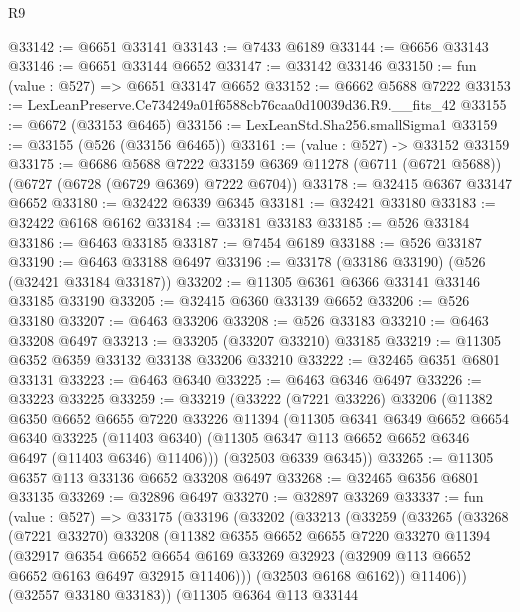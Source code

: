 \begin{lexlean}{R9}
\begin{coremodule}
@33142 := @6651 @33141
@33143 := @7433 @6189
@33144 := @6656 @33143
@33146 := @6651 @33144 @6652
@33147 := @33142 @33146
@33150 := fun (value : @527) => @6651 @33147 @6652
@33152 := @6662 @5688 @7222
@33153 := LexLeanPreserve.Ce734249a01f6588cb76caa0d10039d36.R9.__fits_42
@33155 := @6672 (@33153 @6465)
@33156 := LexLeanStd.Sha256.smallSigma1
@33159 := @33155 (@526 (@33156 @6465))
@33161 := (value : @527) -> @33152 @33159
@33175 := @6686
    @5688
    @7222
    @33159
    @6369
    @11278
    (@6711 (@6721 @5688))
    (@6727 (@6728 (@6729 @6369) @7222 @6704))
@33178 := @32415 @6367 @33147 @6652
@33180 := @32422 @6339 @6345
@33181 := @32421 @33180
@33183 := @32422 @6168 @6162
@33184 := @33181 @33183
@33185 := @526 @33184
@33186 := @6463 @33185
@33187 := @7454 @6189
@33188 := @526 @33187
@33190 := @6463 @33188 @6497
@33196 := @33178 (@33186 @33190) (@526 (@32421 @33184 @33187))
@33202 := @11305 @6361 @6366 @33141 @33146 @33185 @33190
@33205 := @32415 @6360 @33139 @6652
@33206 := @526 @33180
@33207 := @6463 @33206
@33208 := @526 @33183
@33210 := @6463 @33208 @6497
@33213 := @33205 (@33207 @33210) @33185
@33219 := @11305 @6352 @6359 @33132 @33138 @33206 @33210
@33222 := @32465 @6351 @6801 @33131
@33223 := @6463 @6340
@33225 := @6463 @6346 @6497
@33226 := @33223 @33225
@33259 := @33219
    (@33222
      (@7221 @33226)
      @33206
      (@11382
        @6350
        @6652
        @6655
        @7220
        @33226
        @11394
        (@11305
          @6341
          @6349
          @6652
          @6654
          @6340
          @33225
          (@11403 @6340)
          (@11305 @6347 @113 @6652 @6652 @6346 @6497 (@11403 @6346) @11406)))
      (@32503 @6339 @6345))
@33265 := @11305 @6357 @113 @33136 @6652 @33208 @6497
@33268 := @32465 @6356 @6801 @33135
@33269 := @32896 @6497
@33270 := @32897 @33269
@33337 := fun (value : @527) =>
  @33175
    (@33196
      (@33202
        (@33213
          (@33259
            (@33265
              (@33268
                (@7221 @33270)
                @33208
                (@11382
                  @6355
                  @6652
                  @6655
                  @7220
                  @33270
                  @11394
                  (@32917
                    @6354
                    @6652
                    @6654
                    @6169
                    @33269
                    @32923
                    (@32909 @113 @6652 @6652 @6163 @6497 @32915 @11406)))
                (@32503 @6168 @6162))
              @11406))
          (@32557 @33180 @33183))
        (@11305
          @6364
          @113
          @33144

\end{coremodule}
\end{lexlean}
